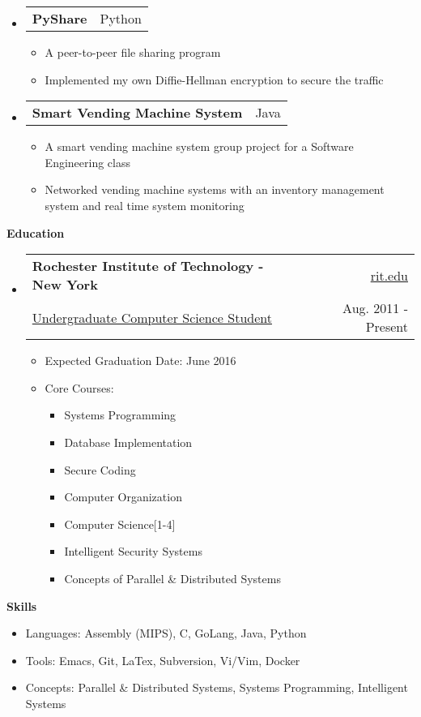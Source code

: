 \documentclass[letterpaper,11pt]{article}
\makeatletter
\newcommand{\resheading}[1]{{\large \colorbox{mygrey}{\begin{minipage}{\textwidth}{\textbf{#1 \vphantom{p\^{E}}}}\end{minipage}}}}
\newcommand{\ressubheading}[4]{
\begin{tabular*}{6.5in}{l@{\extracolsep{\fill}}r}
    \textbf{#1} & #2 \\
    {#3} & {#4} \\
\end{tabular*}\vspace{-6pt}}
\newcommand{\restwosubheading}[2]{
\begin{tabular*}{6.5in}{l@{\extracolsep{\fill}}r}
    \textbf{#1} & #2 \\
\end{tabular*}\vspace{-6pt}}
\makeatother
\begin{document}
\begin{itemize}
\begin{itemize}
      \end{itemize}
    \item
       \restwosubheading{PyShare}{Python}
       \begin{itemize}
   \item{A peer-to-peer file sharing program}
   \item{Implemented my own Diffie-Hellman encryption to secure the traffic}
       \end{itemize}
    \item
      \restwosubheading{Smart Vending Machine System}{Java}
      \begin{itemize}
  \item{A smart vending machine system group project for a Software Engineering class}
  \item{Networked vending machine systems with an inventory management system and real time system monitoring}
      \end{itemize}
  \end{itemize}

\resheading{Education}
  { \footnotesize
  \begin{itemize}
    \item
  \ressubheading{Rochester Institute of Technology - New York}{\href{http://www.rit.edu}{rit.edu}}{\href{http://www.cs.rit.edu/}{Undergraduate Computer Science Student}}{Aug. 2011 - Present}
  \footnotesize
        \begin{itemize}
  \item{Expected Graduation Date: June 2016}
  \item{Core Courses:}
    \begin{itemize}
      \item{Systems Programming}
      \item{Database Implementation}
      \item{Secure Coding}
      \item{Computer Organization}
      \item{Computer Science[1-4]}
      \item{Intelligent Security Systems}
      \item{Concepts of Parallel \& Distributed Systems}
    \end{itemize}
  \end{itemize}
    \end{itemize} %
}



\resheading{{Skills}}
{ \footnotesize
  \begin{itemize}
    \item{Languages: Assembly (MIPS), C, GoLang, Java, Python}
    \item{Tools: Emacs, Git, LaTex, Subversion, Vi/Vim, Docker}
    \item{Concepts: Parallel \& Distributed Systems, Systems Programming, Intelligent Systems}
  \end{itemize}
}
\end{document}
